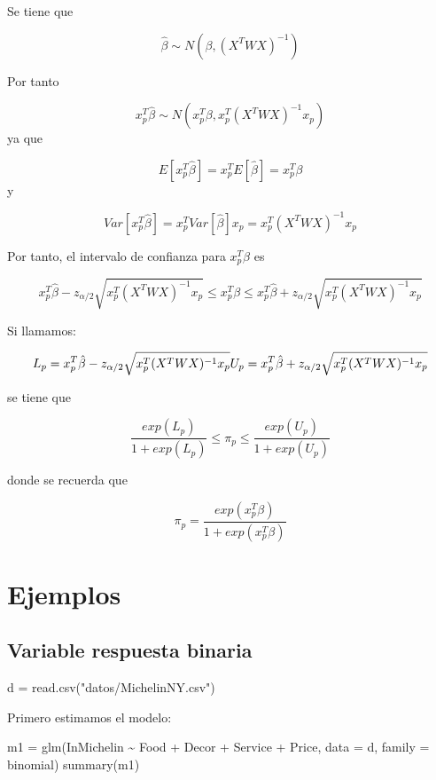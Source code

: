 \documentclass[
]{article}
\newenvironment{Shaded}{\begin{snugshade}}{\end{snugshade}}
\newcommand{\AttributeTok}[1]{\textcolor[rgb]{0.77,0.63,0.00}{#1}}
\newcommand{\FunctionTok}[1]{\textcolor[rgb]{0.00,0.00,0.00}{#1}}
\newcommand{\NormalTok}[1]{#1}
\newcommand{\OtherTok}[1]{\textcolor[rgb]{0.56,0.35,0.01}{#1}}
\newcommand{\SpecialCharTok}[1]{\textcolor[rgb]{0.00,0.00,0.00}{#1}}
\newcommand{\StringTok}[1]{\textcolor[rgb]{0.31,0.60,0.02}{#1}}
\begin{document}
Se tiene que

\[
\hat \beta \sim N(\beta,(X^T W X)^{-1})
\]

Por tanto

\[
x_p^T \hat \beta \sim N(x_p^T \beta, x_p^T (X^T W X)^{-1} x_p)
\] ya que

\[
E[x_p^T \hat \beta] = x_p^T E[\hat \beta] = x_p^T \beta
\] y

\[
Var[x_p^T \hat \beta]  = x_p^T Var[\hat \beta] x_p = x_p^T (X^T W X)^{-1} x_p
\]

Por tanto, el intervalo de confianza para \(x_p^T \beta\) es

\[
x_p^T \hat \beta - z_{\alpha/2} \sqrt{x_p^T (X^T W X)^{-1} x_p} \leq x_p^T \beta \leq x_p^T \hat \beta + z_{\alpha/2} \sqrt{x_p^T (X^T W X)^{-1} x_p}
\]

Si llamamos:

\[
L_p = x_p^T \hat \beta - z_{\alpha/2} \sqrt{x_p^T (X^T W X)^{-1} x_p} \\
U_p = x_p^T \hat \beta + z_{\alpha/2} \sqrt{x_p^T (X^T W X)^{-1} x_p}
\]

se tiene que

\[
\frac{exp(L_p)}{1+exp(L_p)} \leq \pi_p \leq \frac{exp(U_p)}{1+exp(U_p)}
\]

donde se recuerda que

\[
\pi_p = \frac{exp(x_p^T \beta)}{1 + exp(x_p^T \beta)}
\]

\hypertarget{ejemplos}{%
\section{Ejemplos}\label{ejemplos}}

\hypertarget{variable-respuesta-binaria}{%
\subsection{Variable respuesta
binaria}\label{variable-respuesta-binaria}}

\begin{Shaded}
\begin{Highlighting}[]
\NormalTok{d }\OtherTok{=} \FunctionTok{read.csv}\NormalTok{(}\StringTok{"datos/MichelinNY.csv"}\NormalTok{)}
\end{Highlighting}
\end{Shaded}

Primero estimamos el modelo:

\begin{Shaded}
\begin{Highlighting}[]
\NormalTok{m1 }\OtherTok{=} \FunctionTok{glm}\NormalTok{(InMichelin }\SpecialCharTok{\textasciitilde{}}\NormalTok{ Food }\SpecialCharTok{+}\NormalTok{ Decor }\SpecialCharTok{+}\NormalTok{ Service }\SpecialCharTok{+}\NormalTok{ Price, }\AttributeTok{data =}\NormalTok{ d, }\AttributeTok{family =}\NormalTok{ binomial)}
\FunctionTok{summary}\NormalTok{(m1)}
\end{Highlighting}
\end{Shaded}
\end{document}
